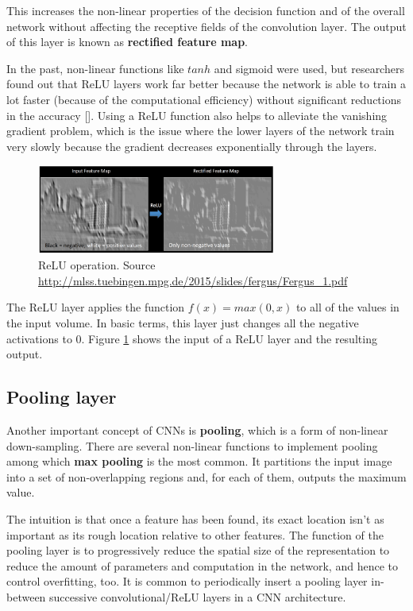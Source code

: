 This increases the non-linear properties of the decision function and of the overall network without affecting the receptive fields of the convolution layer. The output of this layer is known as \textbf{rectified feature map}.

In the past, non-linear functions like $tanh$ and sigmoid were used, but researchers found out that \ac{ReLU} layers work far better because the network is able to train a lot faster (because of the computational efficiency) without significant reductions in the accuracy [\cite{icml2010_NairH10}]. Using a \ac{ReLU} function also helps to alleviate the vanishing gradient problem, which is the issue where the lower layers of the network train very slowly because the gradient decreases exponentially through the layers.

\begin{figure}
	\centering
	\includegraphics[width=0.7\textwidth]{Images/relu}
	\caption{\ac{ReLU} operation. Source \url{http://mlss.tuebingen.mpg.de/2015/slides/fergus/Fergus_1.pdf}}\label{fig:relu}
\end{figure}

The ReLU layer applies the function $f(x) = max(0, x)$ to all of the values in the input volume. In basic terms, this layer just changes all the negative activations to 0. Figure \ref{fig:relu} shows the input of a \ac{ReLU} layer and the resulting output.

\subsection{Pooling layer}

Another important concept of \acsp{CNN} is \textbf{pooling}, which is a form of non-linear down-sampling. There are several non-linear functions to implement pooling among which \textbf{max pooling} is the most common. It partitions the input image into a set of non-overlapping regions and, for each of them, outputs the maximum value.

The intuition is that once a feature has been found, its exact location isn't as important as its rough location relative to other features. The function of the pooling layer is to progressively reduce the spatial size of the representation to reduce the amount of parameters and computation in the network, and hence to control overfitting, too. It is common to periodically insert a pooling layer in-between successive convolutional/\acs{ReLU} layers in a \acs{CNN} architecture.

